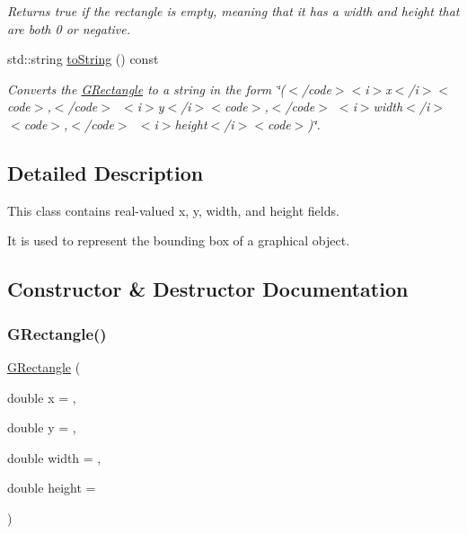 \begin{DoxyCompactItemize}
\begin{DoxyCompactList}\small\item\em Returns {\ttfamily true} if the rectangle is empty, meaning that it has a width and height that are both 0 or negative. \end{DoxyCompactList}\item 
std\+::string \mbox{\hyperlink{classGRectangle_a1fe5121d6528fdea3f243321b3fa3a49}{to\+String}} () const
\begin{DoxyCompactList}\small\item\em Converts the {\ttfamily \mbox{\hyperlink{classGRectangle}{G\+Rectangle}}} to a string in the form {\ttfamily \char`\"{}($<$/code$>$$<$i$>$x$<$/i$>$$<$code$>$,$<$/code$>$~$<$i$>$y$<$/i$>$$<$code$>$,$<$/code$>$
$<$i$>$width$<$/i$>$$<$code$>$,$<$/code$>$~$<$i$>$height$<$/i$>$$<$code$>$)\char`\"{}}. \end{DoxyCompactList}\end{DoxyCompactItemize}


\subsection{Detailed Description}
This class contains real-\/valued x, y, width, and height fields. 

It is used to represent the bounding box of a graphical object. 

\subsection{Constructor \& Destructor Documentation}
\mbox{\label{classGRectangle_a3e31a47f01a0e643b572a11b46ce9f69}} 
\subsubsection{\texorpdfstring{G\+Rectangle()}{GRectangle()}\hspace{0.1cm}{\footnotesize\ttfamily [1/4]}}
{\footnotesize\ttfamily \mbox{\hyperlink{classGRectangle}{G\+Rectangle}} (\begin{DoxyParamCaption}\item[{double}]{x = {},  }\item[{double}]{y = {},  }\item[{double}]{width = {},  }\item[{double}]{height = {} }\end{DoxyParamCaption})}



